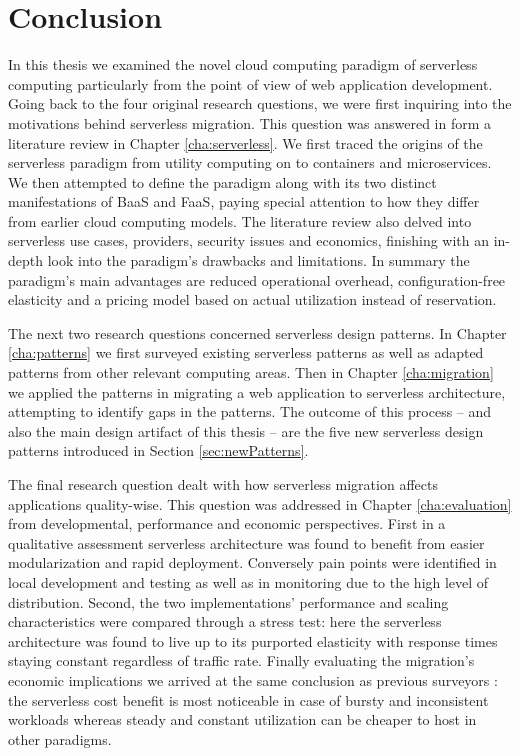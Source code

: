 \chapter{Conclusion}

In this thesis we examined the novel cloud computing paradigm of serverless computing particularly from the point of view of web application development. Going back to the four original research questions, we were first inquiring into the motivations behind serverless migration. This question was answered in form a literature review in Chapter \ref{cha:serverless}. We first traced the origins of the serverless paradigm from utility computing on to containers and microservices. We then attempted to define the paradigm along with its two distinct manifestations of BaaS and FaaS, paying special attention to how they differ from earlier cloud computing models. The literature review also delved into serverless use cases, providers, security issues and economics, finishing with an in-depth look into the paradigm's drawbacks and limitations. In summary the paradigm's main advantages are reduced operational overhead, configuration-free elasticity and a pricing model based on actual utilization instead of reservation.

The next two research questions concerned serverless design patterns. In Chapter \ref{cha:patterns} we first surveyed existing serverless patterns as well as adapted patterns from other relevant computing areas. Then in Chapter \ref{cha:migration} we applied the patterns in migrating a web application to serverless architecture, attempting to identify gaps in the patterns. The outcome of this process -- and also the main design artifact of this thesis -- are the five new serverless design patterns introduced in Section \ref{sec:newPatterns}.

The final research question dealt with how serverless migration affects applications quality-wise. This question was addressed in Chapter \ref{cha:evaluation} from developmental, performance and economic perspectives. First in a qualitative assessment serverless  architecture was found to benefit from easier modularization and rapid deployment. Conversely pain points were identified in local development and testing as well as in monitoring due to the high level of distribution. Second, the two implementations' performance and scaling characteristics were compared through a stress test: here the serverless architecture was found to live up to its purported elasticity with response times staying constant regardless of traffic rate. Finally evaluating the migration's economic implications we arrived at the same conclusion as previous surveyors \parencite[e.g.][]{baldini17currentTrends}: the serverless cost benefit is most noticeable in case of bursty and inconsistent workloads whereas steady and constant utilization can be cheaper to host in other paradigms.

